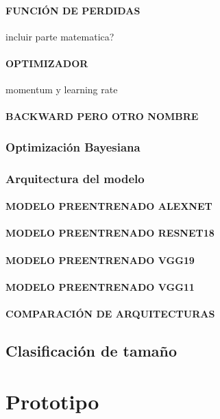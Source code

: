			\subsubsection{\MakeUppercase{Función de perdidas}}
			incluir parte matematica?
			\subsubsection{\MakeUppercase{Optimizador}}
			momentum y learning rate
			\subsubsection{\MakeUppercase{Backward pero otro nombre}}
			
			
		\subsection{Optimización Bayesiana}	
			
			
		\subsection{Arquitectura del modelo}
			\subsubsection{\MakeUppercase{Modelo preentrenado ALEXNET}}
			\subsubsection{\MakeUppercase{Modelo preentrenado RESNET18}}
			\subsubsection{\MakeUppercase{Modelo preentrenado VGG19}}
			\subsubsection{\MakeUppercase{Modelo preentrenado VGG11}}
			\subsubsection{\MakeUppercase{Comparación de arquitecturas}}
		
	\section{Clasificación de tamaño}
	
\chapter{Prototipo}
	

	















